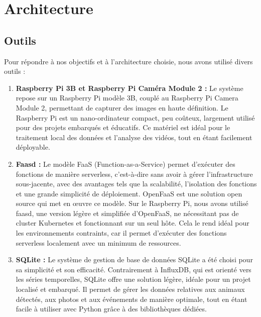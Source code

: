 \documentclass[a4paper,11pt]{article}
\begin{document}
	\section{Architecture}
	\subsection{Outils}
	Pour répondre à nos objectifs et à l’architecture choisie, nous avons utilisé divers outils :
	\begin{enumerate}
			
	\item \textbf{Raspberry Pi 3B et Raspberry Pi Caméra Module 2 :} Le système repose sur un Raspberry Pi modèle 3B, couplé au Raspberry Pi Camera Module 2, permettant de capturer des images en haute définition. Le Raspberry Pi est un nano-ordinateur compact, peu coûteux, largement utilisé pour des projets embarqués et éducatifs. Ce matériel est idéal pour le traitement local des données et l’analyse des vidéos, tout en étant facilement déployable.
	
	\item \textbf{Faasd :} Le modèle FaaS (Function-as-a-Service) permet d’exécuter des fonctions de manière serverless, c’est-à-dire sans avoir à gérer l’infrastructure sous-jacente, avec des avantages tels que la scalabilité, l’isolation des fonctions et une grande simplicité de déploiement. OpenFaaS est une solution open source qui met en œuvre ce modèle. Sur le Raspberry Pi, nous avons utilisé faasd, une version légère et simplifiée d’OpenFaaS, ne nécessitant pas de cluster Kubernetes et fonctionnant sur un seul hôte. Cela le rend idéal pour les environnements contraints, car il permet d’exécuter des fonctions serverless localement avec un minimum de ressources. \cite{faasd}
	
	
	\item \textbf{SQLite :} Le système de gestion de base de données SQLite a été choisi pour sa simplicité et son efficacité. Contrairement à InfluxDB, qui est orienté vers les séries temporelles, SQLite offre une solution légère, idéale pour un projet localisé et embarqué. Il permet de gérer les données relatives aux animaux détectés, aux photos et aux événements de manière optimale, tout en étant facile à utiliser avec Python grâce à des bibliothèques dédiées.\cite{sqlite}
	

\end{enumerate}
\end{document}

